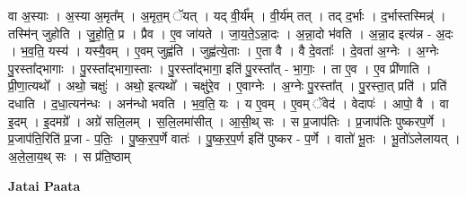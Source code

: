 \documentclass[17pt]{extarticle}
\begin{document}
वा अ॒स्याः । अ॒स्या अ॒मृत᳚म् । अ॒मृत॒म् ॅयत् । यद् वी॒र्य᳚म् । वी॒र्य॑म् तत् । तद् द॒र्भाः । द॒र्भास्तस्मिन्न्॑ । तस्मि॑न् जुहोति । जु॒हो॒ति॒ प्र । प्रैव । ए॒व जा॑यते । जा॒य॒ते॒ऽन्ना॒दः । अ॒न्ना॒दो भ॑वति । अ॒न्ना॒द इत्य॑न्न - अ॒दः । भ॒व॒ति॒ यस्य॑ । यस्यै॒वम् । ए॒वम् जुह्व॑ति । जुह्व॑त्ये॒ताः । ए॒ता वै । वै दे॒वताः᳚ । दे॒वता॑ अ॒ग्नेः । अ॒ग्नेः पु॒रस्ता᳚द्भागाः । पु॒रस्ता᳚द्भागा॒स्ताः । पु॒रस्ता᳚द्भागा॒ इति॑ पु॒रस्ता᳚त् - भा॒गाः॒ । ता ए॒व । ए॒व प्री॑णाति । प्री॒णा॒त्यथो᳚ । अथो॒ चक्षुः॑ । अथो॒ इत्यथो᳚ । चक्षु॑रे॒व । ए॒वाग्नेः । अ॒ग्नेः पु॒रस्ता᳚त् । पु॒रस्ता॒त् प्रति॑ । प्रति॑ दधाति । द॒धा॒त्यन॑न्धः । अन॑न्धो भवति । भ॒व॒ति॒ यः । य ए॒वम् । ए॒वम् ॅवेद॑ । वेदापः॑ । आपो॒ वै । वा इ॒दम् । इ॒दमग्रे᳚ । अग्रे॑ सलि॒लम् । स॒लि॒लमा॑सीत् । आ॒सी॒थ् सः । स प्र॒जाप॑तिः । प्र॒जाप॑तिः पुष्करप॒र्णे । प्र॒जाप॑ति॒रिति॑ प्र॒जा - प॒तिः॒ । पु॒ष्क॒र॒प॒र्णे वातः॑ । पु॒ष्क॒र॒प॒र्ण इति॑ पुष्कर - प॒र्णे । वातो॑ भू॒तः । भू॒तो॑ऽलेलायत् । अ॒ले॒ला॒य॒थ् सः । स प्र॑ति॒ष्ठाम् \newline

\textbf{Jatai Paata} \newline
\end{document}
